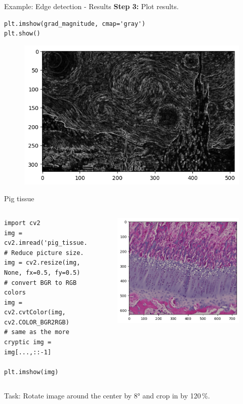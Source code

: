 \documentclass[compress%
,aspectratio=169%
]{beamer}
\begin{document}
\begin{frame}[fragile]{Example: Edge detection - Results}
\textbf{Step 3:} Plot results.
\begin{lstlisting}
plt.imshow(grad_magnitude, cmap='gray')
plt.show()
\end{lstlisting}
\begin{figure}
    \centering
    \includegraphics[width = 7 cm]{img/grad_magnitude.png}
    \label{fig:enter-label}
\end{figure}
\end{frame}

\begin{frame}[fragile]{Pig tissue}
\begin{columns}

\begin{lstlisting}
import cv2
img = cv2.imread('pig_tissue.tif')
# Reduce picture size.
img = cv2.resize(img, None, fx=0.5, fy=0.5)
# convert BGR to RGB colors
img = cv2.cvtColor(img, cv2.COLOR_BGR2RGB)
# same as the more cryptic img = img[...,::-1]

plt.imshow(img)
\end{lstlisting}
    
\begin{figure}
    \centering
    \includegraphics[width = 1\linewidth]{img/pig_python.png}
\end{figure}
\end{columns}
\alert{Task:} Rotate image around the center by 8° and crop in by 120\,\%.
\end{frame}
\end{document}
